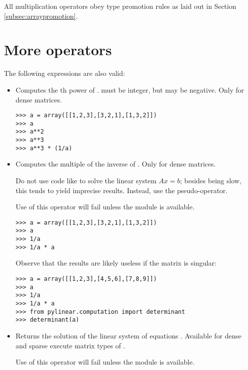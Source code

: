 All multiplication operators obey type promotion rules as laid out
in Section \ref{subsec:arraypromotion}.

\section{More  operators}

The following expressions are also valid:
\begin{itemize} 
\item {}

  Computes the th power of .  must be
  integer, but may be negative. Only for dense matrices.

\begin{verbatim}
>>> a = array([[1,2,3],[3,2,1],[1,3,2]])
>>> a
>>> a**2
>>> a**3
>>> a**3 * (1/a)
\end{verbatim}
\item {}

  Computes the  multiple of the inverse of
  . Only for dense matrices.

  Do not use code like  to solve the linear system
  $Ax=b$; besides being slow, this tends to yield imprecise
  results. Instead, use the  pseudo-operator.

  Use of this operator will fail unless the module
   is available.

\begin{verbatim}
>>> a = array([[1,2,3],[3,2,1],[1,3,2]])
>>> a
>>> 1/a
>>> 1/a * a
\end{verbatim}

  Observe that the results are likely useless if the matrix
  is singular:

\begin{verbatim}
>>> a = array([[1,2,3],[4,5,6],[7,8,9]])
>>> a
>>> 1/a
>>> 1/a * a
>>> from pylinear.computation import determinant
>>> determinant(a)
\end{verbatim}

\item {}

  Returns the solution of the linear system of equations .
  Available for dense and sparse execute matrix types of .

  Use of this operator will fail unless the module
   is available.


\end{itemize}
